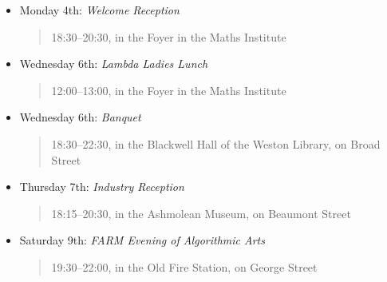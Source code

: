 
\label{Evenings-}

\begin{itemize}
\item Monday 4th: \textit{Welcome Reception}
\begin{quote}
18:30--20:30, in the Foyer in the Maths Institute
\end{quote}
\item Wednesday 6th: \textit{Lambda Ladies Lunch}
\begin{quote}
12:00--13:00, in the Foyer in the Maths Institute
\end{quote}
\item Wednesday 6th: \textit{Banquet}
\begin{quote}
18:30--22:30, in the Blackwell Hall of the Weston Library, on Broad Street
\end{quote}
\item Thursday 7th: \textit{Industry Reception}
\begin{quote}
18:15--20:30, in the Ashmolean Museum, on Beaumont Street
\end{quote}
\item Saturday 9th: \textit{FARM Evening of Algorithmic Arts}
\begin{quote}
19:30--22:00, in the Old Fire Station, on George Street
\end{quote}
\end{itemize}
\bigskip

\outputmap{}

\newpage

\label{HOPE 2017-03}

